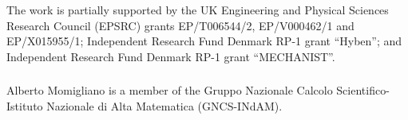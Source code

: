 \documentclass[runningheads]{llncs}
\begin{document}
\begin{credits}
\subsubsection{\ackname}
The work is partially supported by the UK Engineering and Physical Sciences Research Council (EPSRC) grants EP/T006544/2, EP/V000462/1 and EP/X015955/1; Independent
Research Fund Denmark RP-1 grant ``Hyben''; and Independent Research
Fund Denmark RP-1 grant ``MECHANIST''.

\subsubsection{\discintname}
Alberto Momigliano is a member of the Gruppo Nazionale Calcolo Scientifico-Istituto Nazionale di Alta Matematica (GNCS-INdAM).
\end{credits}




\end{document}
